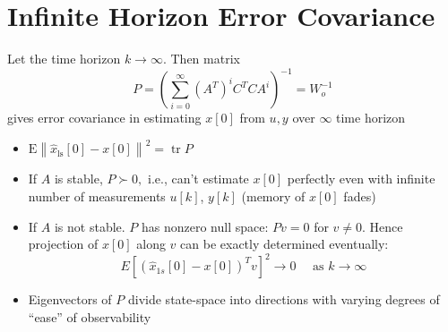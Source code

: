 \documentclass[10pt,a4paper,oneside]{article}
\begin{document}
\section{Infinite Horizon Error Covariance}
Let the time horizon $k \rightarrow \infty .$ Then matrix
\[
P=\left(\sum_{i=0}^{\infty}\left(A^{T}\right)^{i} C^{T} C A^{i}\right)^{-1}=W_{o}^{-1}
\]
gives error covariance in estimating $x[0]$ from $u,y$ over $\infty$ time horizon
\begin{itemize}
\item $\mathrm{E}\left\|\hat{x}_{\mathrm{ls}}[0]-x[0]\right\|^{2}=\operatorname{tr} P$
\item If $A$ is stable, $P \succ 0,$ i.e., can't estimate $x[0]$ perfectly even with infinite number of measurements $u[k]$, $y[k]$ (memory of $x[0]$ fades)
\item If $A$ is not stable. $P$ has nonzero null space: $Pv=0$ for $v\neq0$. Hence projection of $x[0]$ along $v$ can be exactly determined eventually:
\[
E\left[\left(\hat{x}_{1 s}[0]-x[0]\right)^{T} v\right]^{2} \rightarrow 0 \quad \text { as } k \rightarrow \infty
\]
\item Eigenvectors of $P$ divide state-space into directions with varying degrees of ``ease'' of observability
\end{itemize}
\end{document}
